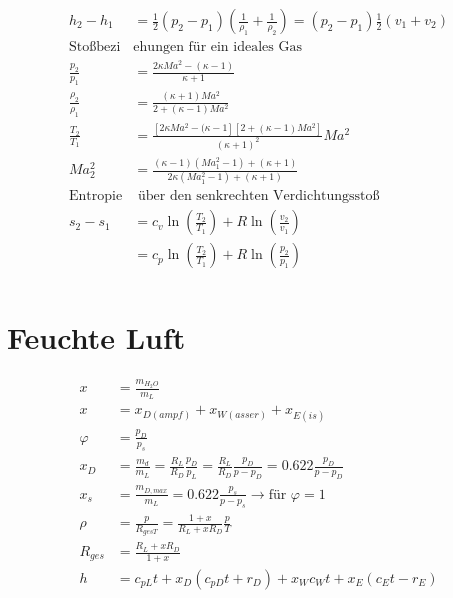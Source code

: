 \documentclass[twocolumn]{article}
\begin{document}
\begin{multicols}{2}
	\begin{align*}
		h_2 - h_1 &= \frac{1}{2}(p_2 - p_1) \left(\frac{1}{\rho_1} + \frac{1}{\rho_2}\right) = (p_2 -p_1) \frac{1}{2}(v_1 + v_2) \\
		\text{Stoßbezi}&\text{ehungen für ein ideales Gas} \\
		\frac{p_2}{p_1} &= \frac{2 \kappa Ma^2 - (\kappa -1)}{\kappa +1} \\
		\frac{\rho_2}{\rho_1} &= \frac{(\kappa +1 ) Ma^2}{2 + (\kappa -1) Ma^2} \\
		\frac{T_2}{T_1} &= \frac{\left[2\kappa Ma^2 - (\kappa -1 \right]\left[2 + (\kappa -1) Ma^2\right]}{(\kappa +1)^2}Ma^2 \\
		Ma_2^2 &= \frac{(\kappa -1)(Ma_1^2 -1) + (\kappa +1)}{2\kappa (Ma_1^2 -1 ) + (\kappa +1)} \\
		\text{Entropie}&\text{ über den senkrechten Verdichtungsstoß} \\
		s_2 -s_1 &= c_v \ln \left(\frac{T_2}{T_1}\right) + R \ln\left(\frac{v_2}{v_1}\right) \\
			 &= c_p \ln \left(\frac{T_2}{T_1}\right) + R \ln\left(\frac{p_2}{p_1}\right) \\
	\end{align*}

%
                                                               
\section{Feuchte Luft}


\begin{align*}
	x &= \frac{m_{H_2O}}{m_L} \\
	x &= x_{D(ampf)} + x_{W(asser)} + x_{E(is)}  \\
	\varphi & = \frac{p_D}{p_s} \\
	x_D &= \frac{m_d}{m_L} = \frac{R_L}{R_D}\frac{p_D}{p_L} = \frac{R_L}{R_D} \frac{p_D}{p-p_D} = 0.622 \frac{p_D}{p-p_D} \\
	x_s &= \frac{m_{D,max}}{m_L} = 0.622 \frac{p_s}{p-p_s} \rightarrow \text{für $\varphi = 1$}\\
	\rho &= \frac{p}{R_{ges T}} = \frac{1 + x}{R_L + xR_D} \frac{p}{T} \\
	R_{ges} &= \frac{R_L + xR_D}{1+x} \\
	h &= c_{pL} t + x_D(c_{pD}t + r_D) + x_W c_W t + x_E (c_E t - r_E) \\
\end{align*}


\end{multicols}
\end{document}

